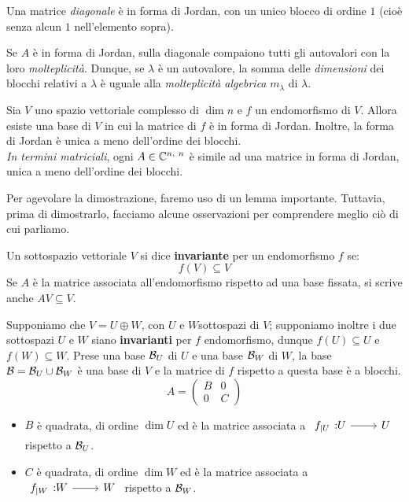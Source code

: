 \begin{observe}
	Una matrice \textit{diagonale} è in forma di Jordan, con un unico blocco di ordine $1$ (cioè senza alcun $1$ nell'elemento sopra).
\end{observe}
\begin{observe}
	Se $A$ è in forma di Jordan, sulla diagonale compaiono tutti gli autovalori con la loro \textit{molteplicità}. Dunque, se $\lambda$ è un autovalore, la somma delle \textit{dimensioni} dei blocchi relativi a $\lambda$ è uguale alla \textit{molteplicità algebrica} $m_\lambda$ di $\lambda$.
\end{observe}
\begin{theorema}
	Sia $V$ uno spazio vettoriale complesso di $\dim n$ e $f$ un endomorfismo di $V$. Allora esiste una base di $V$ in cui la matrice di $f$ è in forma di Jordan. Inoltre, la forma di Jordan è unica a meno dell'ordine dei blocchi.\\
	\textit{In termini matriciali}, ogni $A\in\mathbb{C}^{n,\ n}$ è simile ad una matrice in forma di Jordan, unica a meno dell'ordine dei blocchi.
\end{theorema}
Per agevolare la dimostrazione, faremo uso di un lemma importante. Tuttavia, prima di dimostrarlo, facciamo alcune osservazioni per comprendere meglio ciò di cui parliamo.
\begin{define}
Un sottospazio vettoriale $V$ si dice \textbf{invariante} per un endomorfismo $f$ se:
\begin{equation}
	f\left(V\right)\subseteq V
\end{equation}
Se $A$ è la matrice associata all'endomorfismo rispetto ad una base fissata, si scrive anche $AV\subseteq V$.
\end{define}
\begin{observe}
Supponiamo che $V=U\oplus W$, con $U$ e $W $sottospazi di $V$; supponiamo inoltre i due sottospazi $U$ e $W$ siano \textbf{invarianti} per $f$ endomorfismo, dunque $f\left(U\right)\subseteq U$ e $f\left(W\right)\subseteq W$. Prese una base $\mathcal{B}_U$ di $U$ e una base $\mathcal{B}_W$ di $W$, la base $\mathcal{B}=\mathcal{B}_U\cup \mathcal{B}_W$ è una base di $V$ e la matrice di $f$ rispetto a questa base è a blocchi.
\begin{equation*}
	    A = \left(
	\begin{array}{c|c}
		B & 0\\
		\hline
		0 & C
	\end{array}
	\right)
\end{equation*}
\begin{itemize}
	\item $B$ è quadrata, di ordine $\dim U$ ed è la matrice associata a $\funz{f_{\mid U}}{U}{U}$ rispetto a $\mathcal{B}_U$.
	\item $C$ è quadrata, di ordine $\dim W$ ed è la matrice associata a $\funz{f_{\mid W}}{W}{W}$ rispetto a $\mathcal{B}_W$.
\end{itemize}
\end{observe}

